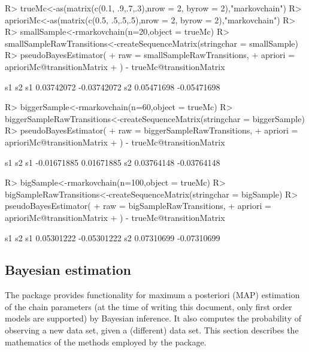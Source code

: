 \documentclass[
  nojss]{jss}
\begin{document}
\begin{CodeChunk}
\begin{CodeInput}
R> trueMc<-as(matrix(c(0.1, .9,.7,.3),nrow = 2, byrow = 2),"markovchain")
R> aprioriMc<-as(matrix(c(0.5, .5,.5,.5),nrow = 2, byrow = 2),"markovchain")
R> 
R> smallSample<-rmarkovchain(n=20,object = trueMc)
R> smallSampleRawTransitions<-createSequenceMatrix(stringchar = smallSample)
R> pseudoBayesEstimator(
+   raw = smallSampleRawTransitions, 
+   apriori = aprioriMc@transitionMatrix
+ ) - trueMc@transitionMatrix
\end{CodeInput}
\begin{CodeOutput}
           s1          s2
s1 0.03742072 -0.03742072
s2 0.05471698 -0.05471698
\end{CodeOutput}
\begin{CodeInput}
R> biggerSample<-rmarkovchain(n=60,object = trueMc)
R> biggerSampleRawTransitions<-createSequenceMatrix(stringchar = biggerSample)
R> pseudoBayesEstimator(
+   raw = biggerSampleRawTransitions,
+   apriori = aprioriMc@transitionMatrix
+ ) - trueMc@transitionMatrix
\end{CodeInput}
\begin{CodeOutput}
            s1          s2
s1 -0.01671885  0.01671885
s2  0.03764148 -0.03764148
\end{CodeOutput}
\begin{CodeInput}
R> bigSample<-rmarkovchain(n=100,object = trueMc)
R> bigSampleRawTransitions<-createSequenceMatrix(stringchar = bigSample)
R> pseudoBayesEstimator(
+   raw = bigSampleRawTransitions,
+   apriori = aprioriMc@transitionMatrix
+ ) - trueMc@transitionMatrix
\end{CodeInput}
\begin{CodeOutput}
           s1          s2
s1 0.05301222 -0.05301222
s2 0.07310699 -0.07310699
\end{CodeOutput}
\end{CodeChunk}

\subsection{Bayesian estimation}\label{bayesian-estimation}

The  package provides functionality for maximum a posteriori (MAP) estimation of the chain parameters (at the time of writing this document, only first order models are supported) by Bayesian inference. It also computes the probability of observing a new data set, given a (different) data set. This section describes the mathematics of the methods employed by the package.
\end{document}
